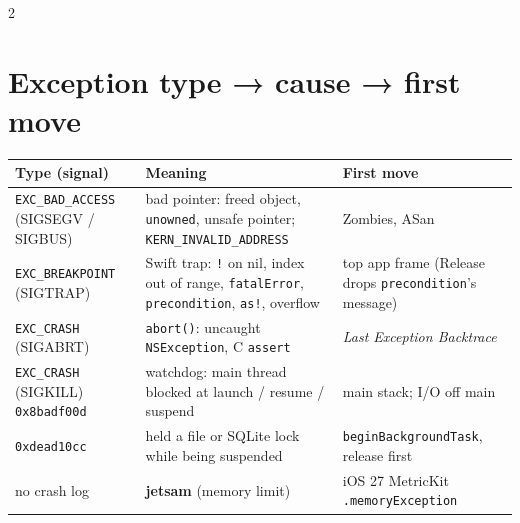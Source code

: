 \documentclass[8pt]{extarticle}
\begin{document}
\begin{multicols}{2}
\raggedright

\section{Exception type → cause → first move}
{\footnotesize
\begin{tabular}{@{}>{\raggedright\arraybackslash}p{21mm}>{\raggedright\arraybackslash}p{32mm}>{\raggedright\arraybackslash}p{22mm}@{}}
\toprule
\textbf{Type (signal)} & \textbf{Meaning} & \textbf{First move} \\
\midrule
\texttt{EXC\_BAD\_ACCESS} (SIGSEGV / SIGBUS) & bad pointer: freed object, \texttt{unowned}, unsafe pointer; \texttt{KERN\_INVALID\_ADDRESS} & Zombies, ASan \\
\texttt{EXC\_BREAKPOINT} (SIGTRAP) & Swift trap: \texttt{!} on nil, index out of range, \texttt{fatalError}, \texttt{precondition}, \texttt{as!}, overflow & top app frame (Release drops \texttt{precondition}'s message) \\
\texttt{EXC\_CRASH} (SIGABRT) & \texttt{abort()}: uncaught \texttt{NSException}, C \texttt{assert} & \emph{Last Exception Backtrace} \\
\texttt{EXC\_CRASH} (SIGKILL) \texttt{0x8badf00d} & watchdog: main thread blocked at launch / resume / suspend & main stack; I/O off main \\
\texttt{0xdead10cc} & held a file or SQLite lock while being suspended & \texttt{beginBackgroundTask}, release first \\
no crash log & \textbf{jetsam} (memory limit) & iOS 27 MetricKit \texttt{.memoryException} \\
\bottomrule
\end{tabular}}


\end{multicols}
\end{document}
